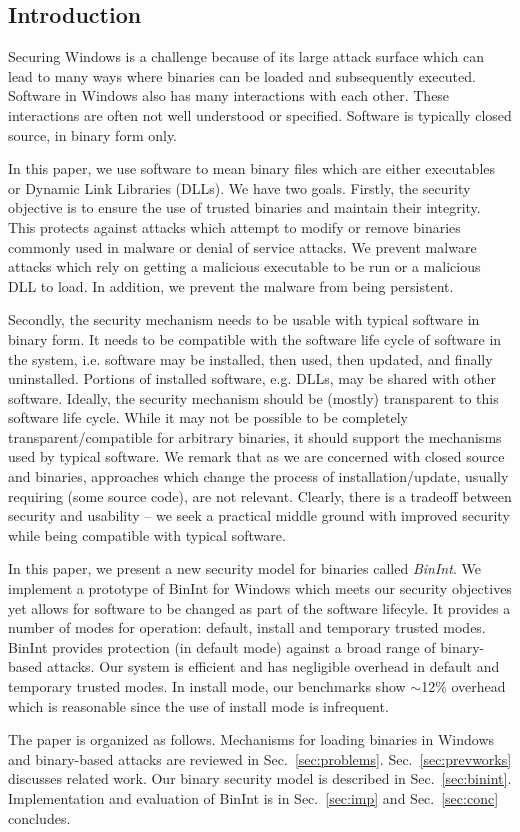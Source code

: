 \subsection{Introduction}

Securing Windows is a challenge because of its large
attack surface which can lead to many ways where
binaries can be loaded and subsequently executed.
Software in Windows also has many interactions with each other.
These interactions are often not well understood or specified.
Software is typically closed source, in binary form only.

In this paper, we use software to mean binary files which are either
executables or Dynamic Link Libraries (DLLs).
We have two goals. Firstly, the security objective 
is to ensure the use of trusted binaries and maintain their integrity.
This protects against attacks which attempt to modify or remove binaries 
commonly used in malware or denial of service attacks.
We prevent malware attacks which rely on
getting a malicious executable to be run or
a malicious DLL to load.
In addition, we prevent the malware from being persistent.

Secondly, the security mechanism needs to be usable with typical
software in binary form.
It needs to be compatible with the software life cycle of software in the
system, i.e.
software may be installed, then used, then updated, and 
finally uninstalled. 
Portions of installed software, e.g. DLLs,
may be shared with other software. 
Ideally, the security mechanism should be (mostly) transparent to 
this software life cycle.
While it may not be possible to be completely transparent/compatible 
for arbitrary binaries, it should support the mechanisms used 
by typical software.
We remark that as we are concerned with
closed source and binaries,
approaches which change the process of installation/update,
usually requiring (some source code), are not relevant.
Clearly, there is a tradeoff between security and usability --
we seek a practical middle ground with improved security while
being compatible with typical software.

In this paper, we present a new security model
for binaries called {\em BinInt}.
We implement a prototype of BinInt for Windows 
which meets our security objectives yet allows
for software to be changed as part of the software lifecyle.
It provides a number of modes for operation: default, install 
and temporary trusted modes.
BinInt provides protection (in default mode) against a broad range of 
binary-based attacks.
Our system is efficient and has negligible overhead in default and temporary
trusted modes. 
In install mode, our benchmarks
show $\sim$12\% overhead which is reasonable since
the use of install mode is infrequent.

The paper is organized as follows.
Mechanisms for loading binaries in
Windows and binary-based attacks are reviewed in Sec.~\ref{sec:problems}.
Sec.~\ref{sec:prevworks} discusses related work.
Our binary security model is described in Sec.~\ref{sec:binint}.
Implementation and evaluation of BinInt is in
Sec.~\ref{sec:imp} and Sec.~\ref{sec:conc} concludes.

